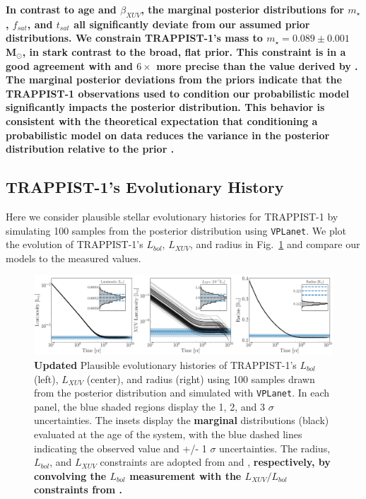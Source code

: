\documentclass[twocolumn]{aastex62}
\newcommand{\xxx}[1]{{\textbf{#1}}}
\newcommand{\vplanet}[0]{\texttt{VPLanet}\xspace}
\begin{document}
\xxx{In contrast to age and $\beta_{XUV}$, the marginal posterior distributions for $m_{\star}$, $f_{sat}$, and $t_{sat}$ all significantly deviate from our assumed prior distributions. We constrain TRAPPIST-1's mass to $m_{\star} = 0.089 \pm{0.001}$ M$_{\odot}$, in stark contrast to the broad, flat prior. This constraint is in a good agreement with and $6\times$ more precise than the value derived by \citet{vanGrootel2018}. The marginal posterior deviations from the priors indicate that the TRAPPIST-1 observations used to condition our probabilistic model significantly impacts the posterior distribution. This behavior is consistent with the theoretical expectation that conditioning a probabilistic model on data reduces the variance in the posterior distribution relative to the prior \citep[e.g. Chapter 2.2,][]{Gelman2013}.}

\subsection{TRAPPIST-1's Evolutionary History}

Here we consider plausible stellar evolutionary histories for TRAPPIST-1 by simulating 100 samples from the posterior distribution using \vplanet. We plot the evolution of TRAPPIST-1's $L_{bol}$, $L_{XUV}$, and radius in Fig.~\ref{fig:evol} and compare our models to the measured values. 

\begin{figure}[t]
	\includegraphics[width=\textwidth]{../Analysis/Evol/trappist1Evol.pdf}
   \caption{\xxx{Updated} Plausible evolutionary histories of TRAPPIST-1's $L_{bol}$ (left), $L_{XUV}$ (center), and radius (right) using 100 samples drawn from the posterior distribution and simulated with \vplanet. In each panel, the blue shaded regions display the 1, 2, and 3 $\sigma$ uncertainties. The insets display the \xxx{marginal} distributions (black) evaluated at the age of the system, with the blue dashed lines indicating the observed value and +/- 1 $\sigma$ uncertainties. The radius, $L_{bol}$, and $L_{XUV}$ constraints are adopted from \citet{vanGrootel2018} and \citet{Wheatley2017}, \xxx{respectively, by convolving the \citet{vanGrootel2018} $L_{bol}$ measurement with the $L_{XUV}/L_{bol}$ constraints from \citet{Wheatley2017}.}}%
    \label{fig:evol}%
\end{figure}
\end{document}
